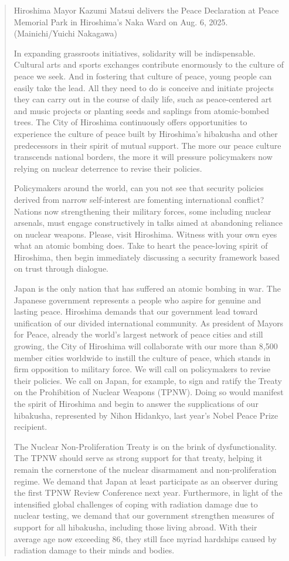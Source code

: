 \begin{quote}
Hiroshima Mayor Kazumi Matsui delivers the Peace Declaration at Peace Memorial Park in Hiroshima's Naka Ward on Aug. 6, 2025. (Mainichi/Yuichi Nakagawa)

In expanding grassroots initiatives, solidarity will be indispensable. Cultural arts and sports exchanges contribute enormously to the culture of peace we seek. And in fostering that culture of peace, young people can easily take the lead. All they need to do is conceive and initiate projects they can carry out in the course of daily life, such as peace-centered art and music projects or planting seeds and saplings from atomic-bombed trees. The City of Hiroshima continuously offers opportunities to experience the culture of peace built by Hiroshima's hibakusha and other predecessors in their spirit of mutual support. The more our peace culture transcends national borders, the more it will pressure policymakers now relying on nuclear deterrence to revise their policies.

Policymakers around the world, can you not see that security policies derived from narrow self-interest are fomenting international conflict? Nations now strengthening their military forces, some including nuclear arsenals, must engage constructively in talks aimed at abandoning reliance on nuclear weapons. Please, visit Hiroshima. Witness with your own eyes what an atomic bombing does. Take to heart the peace-loving spirit of Hiroshima, then begin immediately discussing a security framework based on trust through dialogue.

Japan is the only nation that has suffered an atomic bombing in war. The Japanese government represents a people who aspire for genuine and lasting peace. Hiroshima demands that our government lead toward unification of our divided international community. As president of Mayors for Peace, already the world's largest network of peace cities and still growing, the City of Hiroshima will collaborate with our more than 8,500 member cities worldwide to instill the culture of peace, which stands in firm opposition to military force. We will call on policymakers to revise their policies. We call on Japan, for example, to sign and ratify the Treaty on the Prohibition of Nuclear Weapons (TPNW). Doing so would manifest the spirit of Hiroshima and begin to answer the supplications of our hibakusha, represented by Nihon Hidankyo, last year's Nobel Peace Prize recipient.

The Nuclear Non-Proliferation Treaty is on the brink of dysfunctionality. The TPNW should serve as strong support for that treaty, helping it remain the cornerstone of the nuclear disarmament and non-proliferation regime. We demand that Japan at least participate as an observer during the first TPNW Review Conference next year. Furthermore, in light of the intensified global challenges of coping with radiation damage due to nuclear testing, we demand that our government strengthen measures of support for all hibakusha, including those living abroad. With their average age now exceeding 86, they still face myriad hardships caused by radiation damage to their minds and bodies.


\end{quote}
